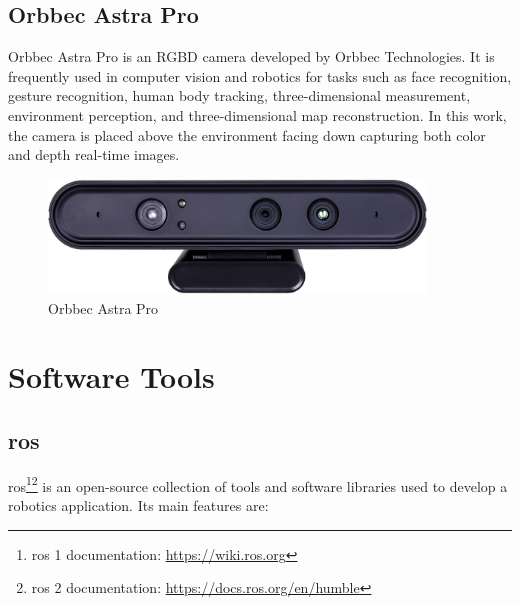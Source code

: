\subsection{Orbbec Astra Pro}

Orbbec Astra Pro is an RGBD camera developed by Orbbec Technologies. It is frequently used in computer vision and robotics for tasks such as face recognition, gesture recognition, human body tracking, three-dimensional measurement, environment perception, and three-dimensional map reconstruction\cite{AstraPro}. In this work, the camera is placed above the environment facing down capturing both color and depth real-time images.

\begin{figure}[h]
\centerline{\includegraphics[height=1.2in]{figs/Astra.jpg}}
\caption[Orbbec Astra Pro]{Orbbec Astra Pro \cite{AstraPro}}
\label{fig:orbbec_astra_pro}
\end{figure}

\section{Software Tools}

\subsection{\acf{ros}}

\acs{ros}\cite{ROS2}\footnote{\acs{ros} 1 documentation: \url{https://wiki.ros.org}}\footnote{\acs{ros} 2 documentation: \url{https://docs.ros.org/en/humble}} is an open-source collection of tools and software libraries used to develop a robotics application. Its main features are:

